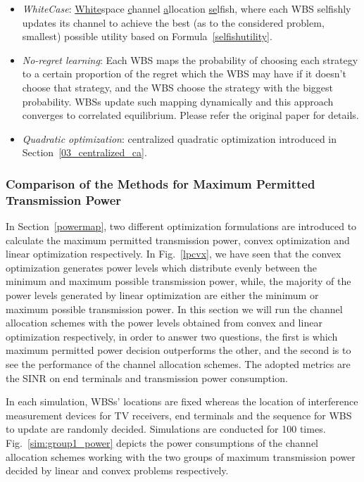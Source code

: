 \begin{itemize}
\item \textit{WhiteCase}:  \underline{White}space \underline{c}hannel \underline{a}llocation \underline{se}lfish, where each WBS selfishly updates its channel to achieve the best (as to the considered problem, smallest) possible utility based on Formula~\ref{selfishutility}.

\item \textit{No-regret learning}: Each WBS maps the probability of choosing each strategy to a certain proportion of the regret which the WBS may have if it doesn't choose that strategy, and the WBS choose the strategy with the biggest probability.  
WBSs update such mapping dynamically and this approach converges to correlated equilibrium. 
Please refer the original paper \cite{hart00correlatedeq} for details.
		
\item \textit{Quadratic optimization}: centralized quadratic optimization introduced in Section~\ref{03_centralized_ca}.
\end{itemize}


\subsubsection*{Comparison of the Methods for Maximum Permitted Transmission Power}

In Section~\ref{powermap}, two different optimization formulations are introduced to calculate the maximum permitted transmission power, \ie convex optimization and linear optimization respectively.
In Fig.~\ref{lpcvx}, we have seen that the convex optimization generates power levels which distribute evenly between the minimum and maximum possible transmission power, while, the majority of the power levels generated by linear optimization are either the minimum or maximum possible transmission power.
In this section we will run the channel allocation schemes with the power levels obtained from convex and linear optimization respectively, in order to answer two questions, the first is which maximum permitted power decision outperforms the other, and the second is to see the performance of the channel allocation schemes.
The adopted metrics are the SINR on end terminals and transmission power consumption.


In each simulation, WBSs' locations are fixed whereas the location of interference measurement devices for TV receivers, end terminals and the sequence for WBS to update are randomly decided.
Simulations are conducted for 100 times.
Fig.~\ref{sim:group1_power} depicts the power consumptions of the channel allocation schemes working with the two groups of maximum transmission power decided by linear and convex problems respectively.

